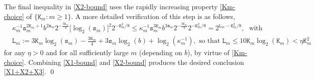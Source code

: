 \documentclass[12pt, twoside]{article}
\newtheorem{lemma}[theorem]{Lemma}
\theoremstyle{definition}
\numberwithin{equation}{section}
\begin{document}
The final inequality in \eqref{X2-bound} uses the rapidly increasing property \eqref{Km-choice} of $\{\mathtt K_m: m \geq 1\}$. A more detailed verification of this step is as follows, 
\begin{align*} 
&\kappa_m^{-1} \mathtt s_m^{2\mathtt K_m+1} b^{2 \mathtt s_m} 2^{-\frac{3\mathtt K_m}{4}} \bigl[ \log_2 (\mathtt s_m) \bigr]^2 2^{- \mathtt K_m^2/8} \leq \kappa_m^{-1} \mathtt s_m^{3\mathtt K_m} b^{3\mathtt s_m} 2^{-\frac{3\mathtt K_m}{4}}  2^{- \mathtt K_m^2/8}
= 2^{\mathtt L_m - \mathtt K_m^2/8}, \; \text{ with } \\
&\mathtt L_m := 3 \mathtt K_m \log_2(\mathtt s_m) - \frac{3\mathtt K_m}{4} + 3 \mathtt s_m \log_2(b) + \log_2(\kappa_m^{-1}), \text{ so that } \mathtt L_m \leq 10\mathtt K_m \log_2(\mathtt K_m) < \eta \mathtt K_m^2  
\end{align*}  
for any $\eta > 0$ and for all sufficiently large $m$ (depending on $b$), by virtue of \eqref{Km-choice}. Combining \eqref{X1-bound} and \eqref{X2-bound} produces the desired conclusion \eqref{X1+X2+X3}.  
\qed
\end{document}
